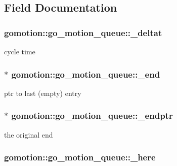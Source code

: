 \subsection{Field Documentation}
\hypertarget{structgomotion_1_1go__motion__queue_a21be21caeb469dc31cae7e4d193f6f63}{
\subsubsection[{\-\_\-deltat}]{ gomotion\-::go\-\_\-motion\-\_\-queue\-::\-\_\-deltat}}\label{structgomotion_1_1go__motion__queue_a21be21caeb469dc31cae7e4d193f6f63}


cycle time 

\hypertarget{structgomotion_1_1go__motion__queue_a843d9fbbb3d45019e412efe56e3356a9}{
\subsubsection[{\-\_\-end}]{$\ast$ gomotion\-::go\-\_\-motion\-\_\-queue\-::\-\_\-end}}\label{structgomotion_1_1go__motion__queue_a843d9fbbb3d45019e412efe56e3356a9}


ptr to last (empty) entry 

\hypertarget{structgomotion_1_1go__motion__queue_a56b0eb35d9ff084d1a1f555dae780ad9}{
\subsubsection[{\-\_\-endptr}]{$\ast$ gomotion\-::go\-\_\-motion\-\_\-queue\-::\-\_\-endptr}}\label{structgomotion_1_1go__motion__queue_a56b0eb35d9ff084d1a1f555dae780ad9}


the original end 

\hypertarget{structgomotion_1_1go__motion__queue_a9df9c96ad6bbcbb60c0c58754790d83b}{
\subsubsection[{\-\_\-here}]{ gomotion\-::go\-\_\-motion\-\_\-queue\-::\-\_\-here}}\label{structgomotion_1_1go__motion__queue_a9df9c96ad6bbcbb60c0c58754790d83b}


